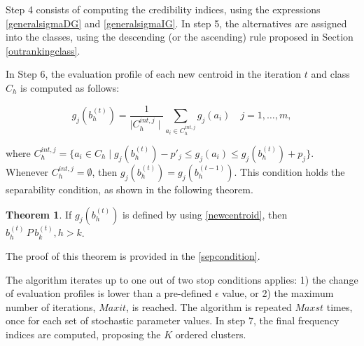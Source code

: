 \documentclass[]{elsarticle}
\theoremstyle{definition}
\newtheorem{prop}{Theorem}
\begin{document}
Step 4 consists of computing the credibility indices, using the expressions \eqref{generalsigmaDG} and  \eqref{generalsigmaIG}. In step 5, the alternatives are assigned into the classes, using the descending (or the ascending) rule proposed in Section \ref{outrankingclass}.

In Step 6, the evaluation profile of each new centroid in the iteration $t$ and class $C_h$ is computed as follows:

\begin{equation}
g_j(b_h^{(t)}) = \frac{1}{\mid C_h^{int,j} \mid} \sum_{a_i \in C_h^{int,j}} g_j(a_i) \quad j=1,\ldots,m,\label{newcentroid}
\end{equation}

\noindent
where $C_h^{int,j}=\{a_i \in C_h \mid g_j(b_h^{(t)})-p'_j\leq g_j(a_i) \leq g_j(b_h^{(t)})+p_j\}$.  Whenever $C_h^{int,j}=\emptyset$, then $g_j(b_h^{(t)})=g_j(b_h^{(t-1)})$.   This condition holds the separability condition, as shown in the following theorem.

\begin{prop}
If  $g_j(b_h^{(t)})$ is defined by using \eqref{newcentroid}, then $b_h^{(t)} \,P\, b_k^{(t)}, h>k$.
\end{prop}

\noindent
The proof of this theorem is provided in the \ref{sepcondition}.

The algorithm iterates up to one out of two stop conditions applies: 1) the change of evaluation profiles is  lower than a pre-defined $\epsilon$ value, or 2) the maximum number of iterations, $Maxit$,  is reached.  The algorithm is repeated $Maxst$ times, once for each set of stochastic parameter values. In step 7, the final frequency indices are computed, proposing the $K$ ordered clusters.
\end{document}
